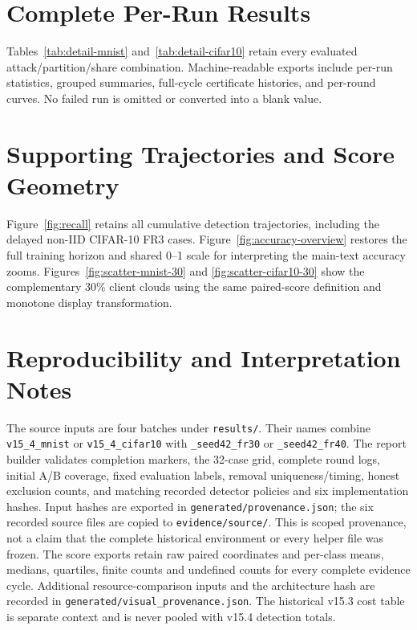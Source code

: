 \documentclass[conference]{IEEEtran}
\begin{document}
\FloatBarrier
\appendices
\section{Complete Per-Run Results}
Tables~\ref{tab:detail-mnist} and~\ref{tab:detail-cifar10} retain every evaluated
attack/partition/share combination. Machine-readable exports include per-run
statistics, grouped summaries, full-cycle certificate histories, and per-round
curves. No failed run is omitted or converted into a blank value.


\section{Supporting Trajectories and Score Geometry}\label{app:trajectories}
Figure~\ref{fig:recall} retains all cumulative detection trajectories, including
the delayed non-IID CIFAR-10 FR3 cases. Figure~\ref{fig:accuracy-overview} restores
the full training horizon and shared 0--1 scale for interpreting the main-text
accuracy zooms. Figures~\ref{fig:scatter-mnist-30} and
\ref{fig:scatter-cifar10-30} show the complementary 30\% client clouds using
the same paired-score definition and monotone display transformation.





\section{Reproducibility and Interpretation Notes}
The source inputs are four batches under \texttt{results/}. Their names combine
\texttt{v15\_4\_mnist} or \texttt{v15\_4\_cifar10} with
\texttt{\_seed42\_fr30} or \texttt{\_seed42\_fr40}.
The report builder validates completion markers, the 32-case
grid, complete round logs, initial A/B coverage, fixed evaluation labels,
removal uniqueness/timing, honest exclusion counts, and matching recorded
detector policies and six implementation hashes. Input hashes are exported
in \texttt{generated/provenance.json}; the six recorded source files are
copied to \texttt{evidence/source/}. This is scoped provenance, not a claim that
the complete historical environment or every helper file was frozen.
The score exports retain raw paired coordinates and per-class means, medians,
quartiles, finite counts and undefined counts for every complete evidence cycle.
Additional resource-comparison inputs and the architecture hash are recorded in
\texttt{generated/visual\_provenance.json}. The historical v15.3 cost table is
separate context and is never pooled with v15.4 detection totals.
\end{document}
